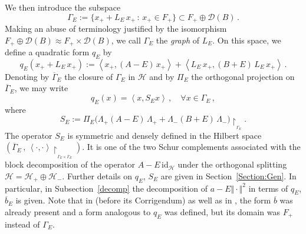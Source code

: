 \documentclass[12pt,reqno]{amsart}
\newcommand{\innerproduct}[2]{\left\langle #1, #2 \right\rangle}
\newcommand{\be}[1]{\begin{equation}\label{#1}}
\newcommand{\ee}{\end{equation}}
\renewcommand{\(}{\left(}
\renewcommand{\)}{\right)}
\begin{document}
\noindent
We then introduce the subspace
\be{def Gamma}
\Gamma_E:= \big\{x_++L_E\,x_+\,:\, x_+\in F_+\big\}\subset F_+\oplus \mathcal D(B)\,.
\ee
Making an abuse of terminology justified by the isomorphism $F_+\oplus \mathcal D(B)\approx F_+\times \mathcal D(B)$, we call $\Gamma_E$ the {\it graph} of $L_E$. On this space, we define a quadratic form $q_E$ by
\be{def Q}
q_E(x_++L_E\,x_+):= \innerproduct{x_+}{(A-E)\,x_+}+\innerproduct{L_E\,x_+}{(B+E)\,L_E\,x_+}\,.
\ee
Denoting by $\overline \Gamma_E$ the closure of $\Gamma_E$ in $\mathcal H$ and by $\Pi_E$ the orthogonal projection on $\overline \Gamma_E$, we may write \[q_E(x)=\innerproduct{x}{S_Ex}\,,\quad \forall x\in \Gamma_E\,,
\]
where
\be{def S}
S_E:= \Pi_E\big( \Lambda_+(A-E)\,\Lambda_+ + \Lambda_-(B+E)\,\Lambda_-\big)\upharpoonright_{_{\Gamma_E}}.
\ee
The operator $S_E$ is symmetric and densely defined in the Hilbert space $\(\overline\Gamma_E\,,\,\innerproduct{\cdot}{\cdot}\!\upharpoonright_{_{\overline\Gamma_E\times \overline\Gamma_E}}\)$. It is one of the two Schur complements associated with the block decomposition of the operator $A-E\,\mathrm{id}_{\mathcal H}$ under the orthogonal splitting $\mathcal H=\mathcal H_+\oplus\mathcal H_-$. 
Further details on $q_E$, $S_E$ are given in Section~\ref{Section:Gen}. In particular, in Subsection~\ref{decomp} the decomposition of $a-E\Vert \cdot\Vert^2$ in terms of $q_E$, $\overline{b}_E$ is given. Note that in \cite{DES00a} (before its Corrigendum) as well as in \cite{EstLos-07,EstLos-08,SST20}, the form $\overline{b}$ was already present and a form analogous to $q_E$ was defined, but its domain was $F_+$ instead of $\Gamma_E$.\smallskip
\end{document}
